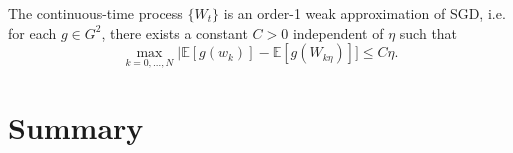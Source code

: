 \documentclass[17pt,institute=e10]{tuhh_presentation}
\newcommand{\E}[1]{\mathbb{E}\left[{#1} \right]}
\begin{document}
\begin{frame}
\begin{block}
  The continuous-time process $\{W_t\}$ is an order-1 weak approximation of SGD, i.e. for each $g \in G^2$, there exists a constant $C > 0$ independent of $\eta$ such that
  \begin{equation*}
    \max_{k=0,\dots,N} |\E{g(w_k)} - \E{g(W_{k\eta})}] \leq C \eta.
  \end{equation*}
\end{block}
\end{frame}
\section{Summary}
\begin{frame}
  \end{frame}
\begin{frame}
\end{frame}








\end{document}
